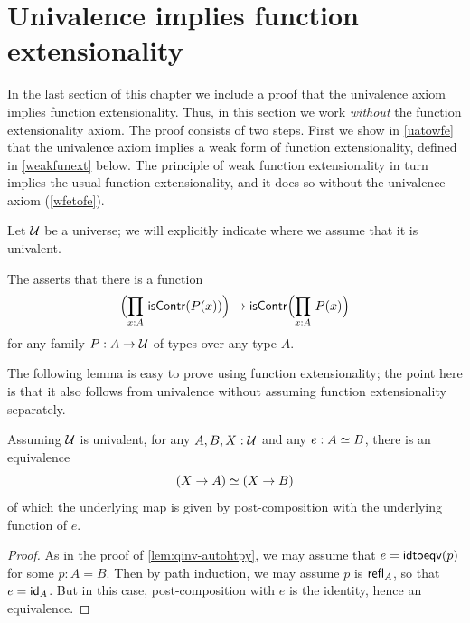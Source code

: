 \section{Univalence implies function extensionality}
\label{sec:univalence-implies-funext}

%
In the last section of this chapter we include a proof that the univalence axiom implies function
extensionality. Thus, in this section we work \emph{without} the function extensionality axiom.
The proof consists of two steps. First we show
in \cref{uatowfe} that the univalence
axiom implies a weak form of function extensionality, defined in \cref{weakfunext} below. The
principle of weak function extensionality in turn implies the usual function extensionality,
and it does so without the univalence axiom (\cref{wfetofe}).

%
Let $\type$ be a universe; we will explicitly indicate where we assume that it is univalent.

\begin{defn}\label{weakfunext}
The 
%
asserts that there is a function
\begin{equation*}
\Parens{\prd{x:A}\iscontr(P(x))} \to\iscontr\Parens{\prd{x:A}P(x)}
\end{equation*}
for any family $P:A\to\type$ of types over any type $A$.
\end{defn}

The following lemma is easy to prove using function extensionality; the point here is that it also follows from univalence without assuming function extensionality separately.

\begin{lem} \label{UA-eqv-hom-eqv}
Assuming $\type$ is univalent, for any $A,B,X:\type$ and any $e:\eqv{A}{B}$, there is an equivalence
\begin{equation*}
\eqv{(X\to A)}{(X\to B)}
\end{equation*}
of which the underlying map is given by post-composition with the underlying function of $e$.
\end{lem}

\begin{proof}
  As in the proof of \cref{lem:qinv-autohtpy}, we may assume that $e = \idtoeqv(p)$ for some $p:A=B$.
  Then by path induction, we may assume $p$ is $\refl{A}$, so that $e = \idfunc[A]$.
  But in this case, post-composition with $e$ is the identity, hence an equivalence.
\end{proof}

